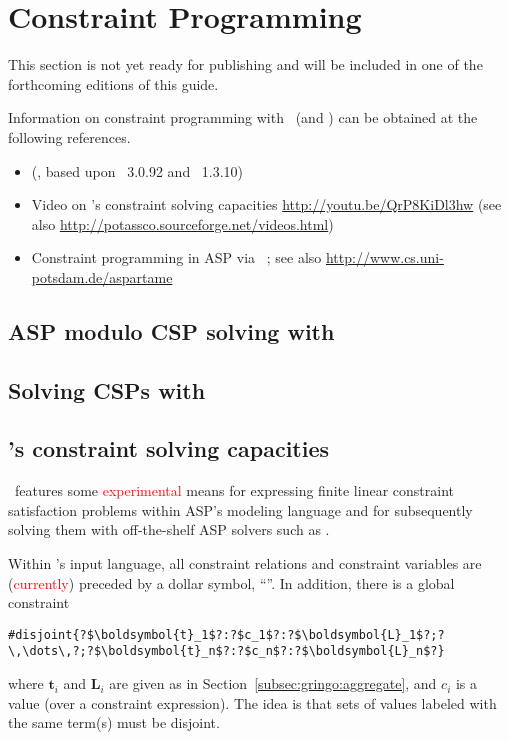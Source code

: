 \section{Constraint Programming}\label{sec:constraint}

This section is not yet ready for publishing
and will be included in one of the forthcoming editions of this guide.

Information on constraint programming with \gringo\ (and \clingcon) can be obtained at the following references.

\begin{itemize}
\item \cite{geossc09a,ostsch12a} (\clingcon, based upon \gringo~3.0.92 and \clasp~1.3.10)
\item Video on \gringo's constraint solving capacities \url{http://youtu.be/QrP8KiDl3hw} (see also \url{http://potassco.sourceforge.net/videos.html})
\item Constraint programming in ASP via \aspartame\ \cite{bageinscsotawe13a}; see also \url{http://www.cs.uni-potsdam.de/aspartame}
\end{itemize}

\subsection{ASP modulo CSP solving with \clingcon}
\label{sec:clingcon}

\subsection{Solving CSPs with \aspartame}
\label{sec:aspartame}

\subsection{\gringo's constraint solving capacities}

\gringo\ features some \textcolor{red}{experimental} means for expressing finite linear constraint satisfaction problems within ASP's modeling language and
for subsequently solving them with off-the-shelf ASP solvers such as \clasp.

Within \gringo's input language,
all constraint relations and constraint variables are (\textcolor{red}{currently}) preceded by a dollar symbol, ``\var{\$}''.
In addition, there is a global constraint
\begin{lstlisting}[numbers=none,escapechar=?]
#disjoint{?$\boldsymbol{t}_1$?:?$c_1$?:?$\boldsymbol{L}_1$?;?\,\dots\,?;?$\boldsymbol{t}_n$?:?$c_n$?:?$\boldsymbol{L}_n$?}
\end{lstlisting}
where $\boldsymbol{t}_i$ and $\boldsymbol{L}_i$ are given as in Section~\ref{subsec:gringo:aggregate},
and $c_i$ is a value (over a constraint expression).
%
The idea is that sets of values labeled with the same term(s) must be disjoint.


